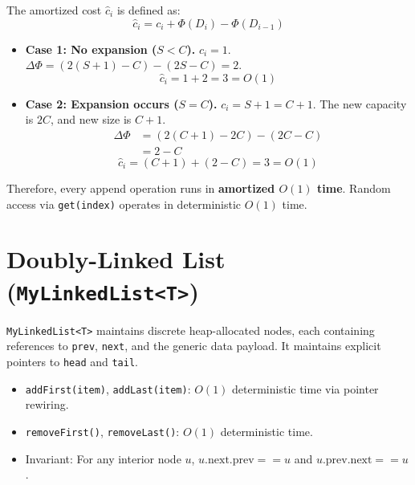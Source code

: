 The amortized cost $\hat{c}_i$ is defined as:
\begin{equation}
\hat{c}_i = c_i + \Phi(D_i) - \Phi(D_{i-1})
\end{equation}
\begin{itemize}
    \item \textbf{Case 1: No expansion ($S < C$).}
    $c_i = 1$. $\Delta \Phi = (2(S+1) - C) - (2S - C) = 2$.
    \begin{equation}
    \hat{c}_i = 1 + 2 = 3 = O(1)
    \end{equation}
    \item \textbf{Case 2: Expansion occurs ($S = C$).}
    $c_i = S + 1 = C + 1$. The new capacity is $2C$, and new size is $C + 1$.
    \begin{align}
    \Delta \Phi &= (2(C + 1) - 2C) - (2C - C) \nonumber \\
    &= 2 - C
    \end{align}
    \begin{equation}
    \hat{c}_i = (C + 1) + (2 - C) = 3 = O(1)
    \end{equation}
\end{itemize}
Therefore, every append operation runs in \textbf{amortized $O(1)$ time}. Random access via \texttt{get(index)} operates in deterministic $O(1)$ time.

\section{Doubly-Linked List (\texttt{MyLinkedList<T>})}
\texttt{MyLinkedList<T>} maintains discrete heap-allocated nodes, each containing references to \texttt{prev}, \texttt{next}, and the generic data payload. It maintains explicit pointers to \texttt{head} and \texttt{tail}.
\begin{itemize}
    \item \texttt{addFirst(item)}, \texttt{addLast(item)}: $O(1)$ deterministic time via pointer rewiring.
    \item \texttt{removeFirst()}, \texttt{removeLast()}: $O(1)$ deterministic time.
    \item Invariant: For any interior node $u$, $u.\text{next}.\text{prev} == u$ and $u.\text{prev}.\text{next} == u$.
\end{itemize}

